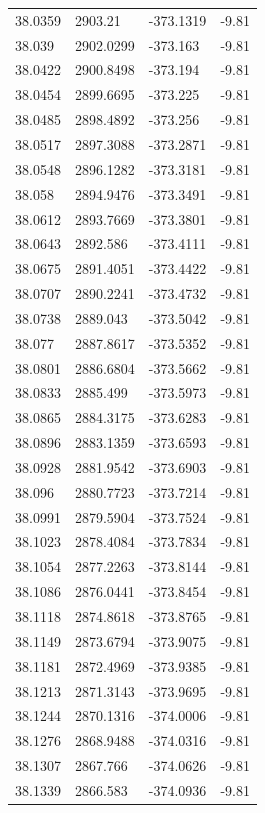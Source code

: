 \begin{table}[H]
\begin{tabular}{llll}
38.0359 & 2903.21 & -373.1319 & -9.81 \\
38.039 & 2902.0299 & -373.163 & -9.81 \\
38.0422 & 2900.8498 & -373.194 & -9.81 \\
38.0454 & 2899.6695 & -373.225 & -9.81 \\
38.0485 & 2898.4892 & -373.256 & -9.81 \\
38.0517 & 2897.3088 & -373.2871 & -9.81 \\
38.0548 & 2896.1282 & -373.3181 & -9.81 \\
38.058 & 2894.9476 & -373.3491 & -9.81 \\
38.0612 & 2893.7669 & -373.3801 & -9.81 \\
38.0643 & 2892.586 & -373.4111 & -9.81 \\
38.0675 & 2891.4051 & -373.4422 & -9.81 \\
38.0707 & 2890.2241 & -373.4732 & -9.81 \\
38.0738 & 2889.043 & -373.5042 & -9.81 \\
38.077 & 2887.8617 & -373.5352 & -9.81 \\
38.0801 & 2886.6804 & -373.5662 & -9.81 \\
38.0833 & 2885.499 & -373.5973 & -9.81 \\
38.0865 & 2884.3175 & -373.6283 & -9.81 \\
38.0896 & 2883.1359 & -373.6593 & -9.81 \\
38.0928 & 2881.9542 & -373.6903 & -9.81 \\
38.096 & 2880.7723 & -373.7214 & -9.81 \\
38.0991 & 2879.5904 & -373.7524 & -9.81 \\
38.1023 & 2878.4084 & -373.7834 & -9.81 \\
38.1054 & 2877.2263 & -373.8144 & -9.81 \\
38.1086 & 2876.0441 & -373.8454 & -9.81 \\
38.1118 & 2874.8618 & -373.8765 & -9.81 \\
38.1149 & 2873.6794 & -373.9075 & -9.81 \\
38.1181 & 2872.4969 & -373.9385 & -9.81 \\
38.1213 & 2871.3143 & -373.9695 & -9.81 \\
38.1244 & 2870.1316 & -374.0006 & -9.81 \\
38.1276 & 2868.9488 & -374.0316 & -9.81 \\
38.1307 & 2867.766 & -374.0626 & -9.81 \\
38.1339 & 2866.583 & -374.0936 & -9.81 \\

\end{tabular}
\end{table}
